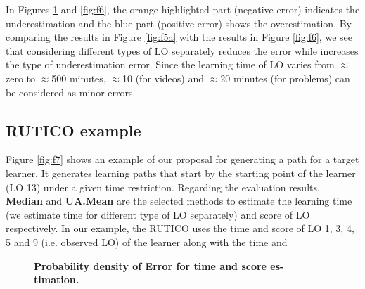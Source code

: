 \documentclass{sig-alternate}
\begin{document}
In Figures \ref{fig:f5} and \ref{fig:f6}, the orange highlighted part (negative error) indicates the underestimation and the blue part (positive error) shows the overestimation. By comparing the results in Figure \ref{fig:f5a} with the results in Figure \ref{fig:f6}, we see that considering different types of LO separately reduces the error while increases the type of underestimation error. Since the learning time of LO varies from $\approx$zero to $\approx$500 minutes, $\approx$10 (for videos) and $\approx$20 minutes (for problems) can be considered as minor errors.

\subsection{RUTICO example}
\label{subsec:ruticoexample}
\noindent Figure \ref{fig:f7} shows an example of our proposal for generating a path for a target learner. It generates learning paths that start by the
starting point of the learner (LO 13) under a given time restriction. Regarding the evaluation results, \textbf{Median} and \textbf{UA.Mean} are the selected methods to estimate the learning time (we estimate time for different type of LO separately) and score of LO respectively. In our example, the RUTICO uses the time and score of LO 1, 3, 4, 5 and 9 (i.e. observed LO) of the learner along with the time and

\begin{figure}[H]
\centering
{}\par        
{}
\caption{\textbf{Probability density of Error for time and score es-
timation.}}
\label{fig:f5}
\end{figure}
\end{document}
